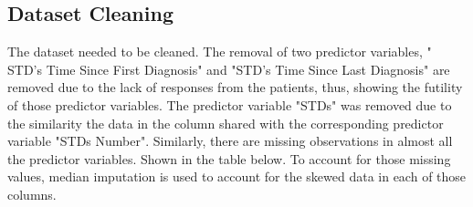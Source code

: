 \documentclass[12pt]{article}
\numberwithin{equation}{section}
\begin{document}
\subsection{Dataset Cleaning}
The dataset needed to be cleaned. The removal of two predictor variables, " STD's Time Since First Diagnosis" and "STD's Time Since Last Diagnosis" are removed due to the lack of responses from the patients, thus, showing the futility of those predictor variables. The predictor variable "STDs" was removed due to the similarity the data in the column shared with the corresponding predictor variable "STDs Number". Similarly, there are missing observations in almost all the predictor variables. Shown in the table below.  To account for those missing values, median imputation is used to account for the skewed data in each of those columns. 
\begin{table}


\end{table}
\end{document}
